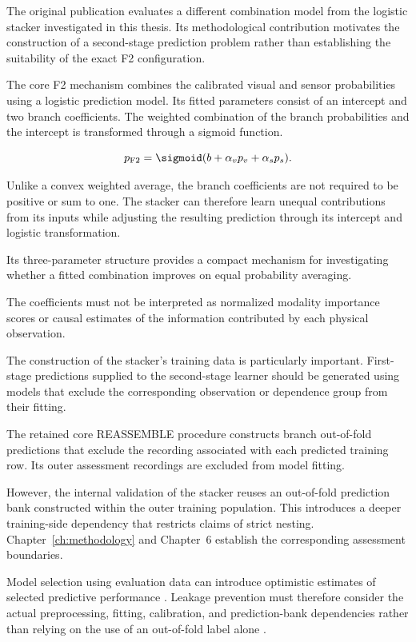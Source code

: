 The original publication evaluates a different combination model from the logistic stacker investigated in this thesis. Its methodological contribution motivates the construction of a second-stage prediction problem rather than establishing the suitability of the exact F2 configuration.

The core F2 mechanism combines the calibrated visual and sensor probabilities using a logistic prediction model. Its fitted parameters consist of an intercept and two branch coefficients. The weighted combination of the branch probabilities and the intercept is transformed through a sigmoid function.

\begin{equation}
 p_{\mathrm{F2}}=\sigmoid(b+\alpha_v p_v+\alpha_s p_s).
 \label{eq:f2}
\end{equation}

Unlike a convex weighted average, the branch coefficients are not required to be positive or sum to one. The stacker can therefore learn unequal contributions from its inputs while adjusting the resulting prediction through its intercept and logistic transformation.

Its three-parameter structure provides a compact mechanism for investigating whether a fitted combination improves on equal probability averaging.

The coefficients must not be interpreted as normalized modality importance scores or causal estimates of the information contributed by each physical observation.

The construction of the stacker’s training data is particularly important. First-stage predictions supplied to the second-stage learner should be generated using models that exclude the corresponding observation or dependence group from their fitting.

The retained core REASSEMBLE procedure constructs branch out-of-fold predictions that exclude the recording associated with each predicted training row. Its outer assessment recordings are excluded from model fitting.

However, the internal validation of the stacker reuses an out-of-fold prediction bank constructed within the outer training population. This introduces a deeper training-side dependency that restricts claims of strict nesting. Chapter~\ref{ch:methodology} and Chapter~6 establish the corresponding assessment boundaries.

Model selection using evaluation data can introduce optimistic estimates of selected predictive performance \parencite{P004}. Leakage prevention must therefore consider the actual preprocessing, fitting, calibration, and prediction-bank dependencies rather than relying on the use of an out-of-fold label alone \parencite{P017}.


